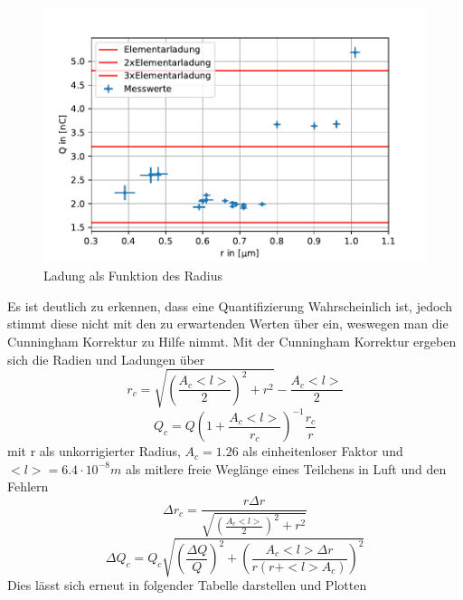 \documentclass{scrartcl}
\begin{document}
	\begin{figure}[H]
		\centering
		\includegraphics[width=1.0\textwidth]{QoverRUncorr.pdf}
		\caption{Ladung als Funktion des Radius}
	\end{figure}
	Es ist deutlich zu erkennen, dass eine Quantifizierung Wahrscheinlich ist, jedoch stimmt diese
	nicht mit den zu erwartenden Werten über ein, weswegen man die Cunningham Korrektur zu Hilfe nimmt.
	Mit der Cunningham Korrektur ergeben sich die Radien und Ladungen über
	\begin{equation}
		r_c = \sqrt{(\frac{A_c <l>}{2})^2 + r^2} - \frac{A_c <l>}{2} 
	\end{equation}
	\begin{equation}
		Q_c = Q(1+\frac{A_c<l>}{r_c})^{-1} \frac{r_c}{r}
	\end{equation}
	mit r als unkorrigierter Radius, $A_c=1.26$ als einheitenloser Faktor und $<l>=6.4\cdot 10^{-8} m$ als
	mitlere freie Weglänge eines Teilchens in Luft und den Fehlern
	\begin{equation}
		\Delta r_c = \frac{r \Delta r}{\sqrt{(\frac{A_c <l>}{2})^2 + r^2}}
	\end{equation}
	\begin{equation}
		\Delta Q_c = Q_c \sqrt{(\frac{\Delta Q}{Q})^2 + (\frac{A_c <l> \Delta r}{r(r+<l>A_c)})^2}
	\end{equation}
	Dies lässt sich erneut in folgender Tabelle darstellen und Plotten
\end{document}

